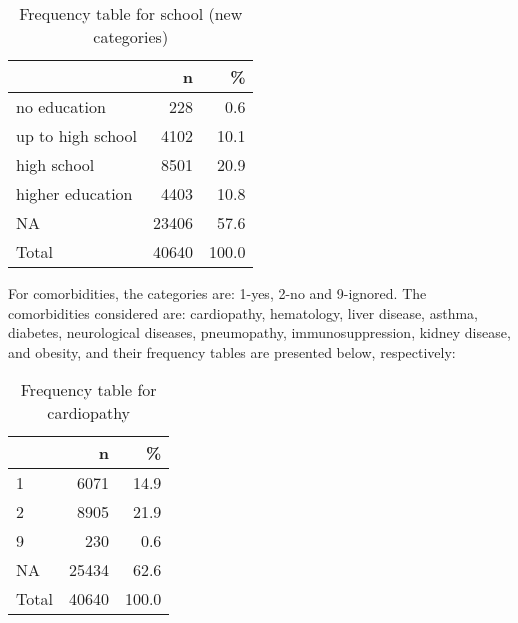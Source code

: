 \documentclass[
]{article}
\newenvironment{Shaded}{\begin{snugshade}}{\end{snugshade}}
\newcommand{\DataTypeTok}[1]{\textcolor[rgb]{0.13,0.29,0.53}{#1}}
\newcommand{\DecValTok}[1]{\textcolor[rgb]{0.00,0.00,0.81}{#1}}
\newcommand{\KeywordTok}[1]{\textcolor[rgb]{0.13,0.29,0.53}{\textbf{#1}}}
\newcommand{\NormalTok}[1]{#1}
\newcommand{\OperatorTok}[1]{\textcolor[rgb]{0.81,0.36,0.00}{\textbf{#1}}}
\newcommand{\OtherTok}[1]{\textcolor[rgb]{0.56,0.35,0.01}{#1}}
\newcommand{\StringTok}[1]{\textcolor[rgb]{0.31,0.60,0.02}{#1}}
\begin{document}
\begin{table}[!h]

\caption{\label{tab:unnamed-chunk-22}Frequency table for school (new categories)}
\centering
\begin{tabular}[t]{l|r|r}
\hline
  & n & \%\\
\hline
no education & 228 & 0.6\\
\hline
up to high school & 4102 & 10.1\\
\hline
high school & 8501 & 20.9\\
\hline
higher education & 4403 & 10.8\\
\hline
NA & 23406 & 57.6\\
\hline
Total & 40640 & 100.0\\
\hline
\end{tabular}
\end{table}

For comorbidities, the categories are: 1-yes, 2-no and 9-ignored. The
comorbidities considered are: cardiopathy, hematology, liver disease,
asthma, diabetes, neurological diseases, pneumopathy, immunosuppression,
kidney disease, and obesity, and their frequency tables are presented
below, respectively:

\begin{Shaded}
\end{Shaded}

\begin{table}[!h]

\caption{\label{tab:unnamed-chunk-23}Frequency table for cardiopathy}
\centering
\begin{tabular}[t]{l|r|r}
\hline
  & n & \%\\
\hline
1 & 6071 & 14.9\\
\hline
2 & 8905 & 21.9\\
\hline
9 & 230 & 0.6\\
\hline
NA & 25434 & 62.6\\
\hline
Total & 40640 & 100.0\\
\hline
\end{tabular}
\end{table}
\end{document}
